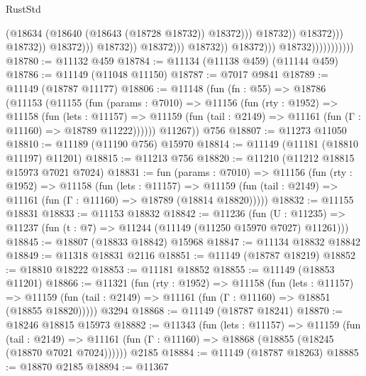 \begin{lexlean}{RustStd}
\begin{coremodule}
                                                                    (@18634
                                                                      (@18640
                                                                        (@18643 (@18728 @18732))
                                                                        @18372)))
                                                                  @18732))
                                                              @18372)))
                                                        @18732))
                                                    @18372)))
                                              @18732))
                                          @18372)))
                                    @18732))
                                @18372)))
                          @18732)))))))))))
@18780 := @11132 @459
@18784 := @11134 (@11138 @459) (@11144 @459)
@18786 := @11149 (@11048 @11150)
@18787 := @7017 @9841
@18789 := @11149 (@18787 @11177)
@18806 := @11148
    (fun (fn : @55) =>
    @18786
      (@11153
        (@11155
          (fun (params : @7010) =>
          @11156
            (fun (rty : @1952) =>
            @11158
              (fun (lets : @11157) =>
              @11159 (fun (tail : @2149) => @11161 (fun (Γ : @11160) => @18789 @11222))))))
        @11267))
    @756
@18807 := @11273 @11050
@18810 := @11189 (@11190 @756) @15970
@18814 := @11149 (@11181 (@18810 @11197) @11201)
@18815 := @11213 @756
@18820 := @11210 (@11212 @18815 @15973 @7021 @7024)
@18831 := fun (params : @7010) =>
  @11156
    (fun (rty : @1952) =>
    @11158
      (fun (lets : @11157) =>
      @11159 (fun (tail : @2149) => @11161 (fun (Γ : @11160) => @18789 (@18814 @18820)))))
@18832 := @11155 @18831
@18833 := @11153 @18832
@18842 := @11236
    (fun (U : @11235) => @11237 (fun (t : @7) => @11244 (@11149 (@11250 @15970 @7027) @11261)))
@18845 := @18807 (@18833 @18842) @15968
@18847 := @11134 @18832 @18842
@18849 := @11318 @18831 @2116
@18851 := @11149 (@18787 @18219)
@18852 := @18810 @18222
@18853 := @11181 @18852
@18855 := @11149 (@18853 @11201)
@18866 := @11321
    (fun (rty : @1952) =>
    @11158
      (fun (lets : @11157) =>
      @11159 (fun (tail : @2149) => @11161 (fun (Γ : @11160) => @18851 (@18855 @18820)))))
    @3294
@18868 := @11149 (@18787 @18241)
@18870 := @18246 @18815 @15973
@18882 := @11343
    (fun (lets : @11157) =>
    @11159
      (fun (tail : @2149) =>
      @11161 (fun (Γ : @11160) => @18868 (@18855 (@18245 (@18870 @7021 @7024))))))
    @2185
@18884 := @11149 (@18787 @18263)
@18885 := @18870 @2185
@18894 := @11367

\end{coremodule}
\end{lexlean}
